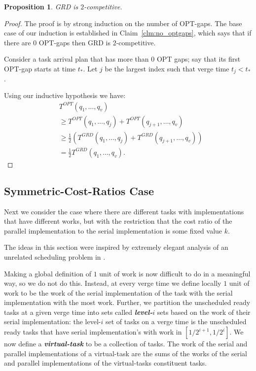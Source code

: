 \documentclass[twocolumn]{article}[10pt]
\newcommand{\defn}[1]{{\textit{\textbf{\boldmath #1}}}\xspace}
\newcommand{\paren}[1]{\left( #1 \right)}
\newtheorem{proposition}{Proposition}
\begin{document}
\begin{proposition}
  \label{prop:2competitive}
  GRD is $2$-competitive.
\end{proposition}
\begin{proof}
  The proof is by strong induction on the number of OPT-gaps. 
  The base case of our induction is established in
  Claim~\ref{clm:no_optgaps}, which says that if there are $0$
  OPT-gaps then GRD is $2$-competitive. 

  Consider a task arrival plan that has more than $0$ OPT gaps;
  say that its first OPT-gap starts at time $t_*$.
  Let $j$ be the largest index such that verge time $t_j <
  t_*$.

  Using our inductive hypothesis we have:
  \begin{align*}
  &T^{OPT}(q_1, \ldots, q_v) \\
  &\ge T^{OPT}(q_1, \ldots, q_j) + T^{OPT}(q_{j+1}, \ldots, q_{v})\\
  &\ge \frac{1}{2}\paren{T^{GRD}(q_1, \ldots, q_j) + T^{GRD}(q_{j+1}, \ldots, q_{v})}\\
  &=\frac{1}{2} T^{GRD}(q_1, \ldots, q_v).
  \end{align*}

\end{proof}


\subsection{Symmetric-Cost-Ratios Case}
\label{subsec:symmetriccostratio}
Next we consider the case where there are different tasks with
implementations that have different works, but with the
restriction that the cost ratio of the parallel implementation to
the serial implementation is some fixed value $k$.

The ideas in this section were inspired by extremely elegant
analysis of an unrelated scheduling problem in \cite{bamboo20}.

Making a global definition of $1$ unit of work is now difficult
to do in a meaningful way, so we do not do this. Instead, at
every verge time we define locally $1$ unit of work to be the
work of the serial implementation of the task with the serial
implementation with the most work. 
Further, we partition the unscheduled ready tasks at a given verge time into
sets called \defn{level-$i$} sets based on the work of their serial
implementation: the level-$i$ set of tasks on a verge time is the
unscheduled ready tasks that have serial implementation's with
work in $[1/2^{i+1}, 1/2^{i}]$.
We now define a \defn{virtual-task} to be a collection of tasks.
The work of the serial and parallel implementations of a
virtual-task are the sums of the works of the serial and parallel
implementations of the virtual-tasks constituent tasks.
\end{document}
